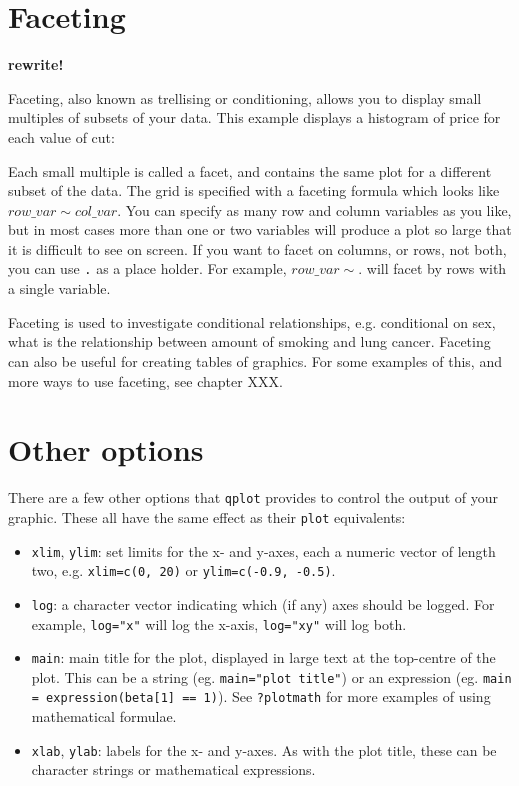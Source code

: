 \section{Faceting}\label{sec:faceting}

{\bf rewrite!}

Faceting, also known as trellising or conditioning, allows you to display small multiples of subsets of your data.  This example displays a histogram of price for each value of cut:

% 

Each small multiple is called a facet, and contains the same plot for a different subset of the data.  The grid is specified with a faceting formula which looks like $row\_var \sim col\_var $.  You can specify as many row and column variables as you like, but in most cases more than one or two variables will produce a plot so large that it is difficult to see on screen.  If you want to facet on columns, or rows, not both, you can use {\tt .} as a place holder.  For example, $row\_var \sim .$ will facet by rows with a single variable.  

% 

Faceting is used to investigate conditional relationships, e.g. conditional on sex, what is the relationship between amount of smoking and lung cancer.  Faceting can also be useful for creating tables of graphics.  For some examples of this, and more ways to use faceting, see chapter XXX.

\section{Other options}\label{sec:other_options}

There are a few other options that {\tt qplot} provides to control the output of your graphic.  These all have the same effect as their {\tt plot} equivalents:

\begin{itemize}
	\item {\tt xlim}, {\tt ylim}: set limits for the x- and y-axes, each a numeric vector of length two, e.g. {\tt xlim=c(0, 20)} or {\tt ylim=c(-0.9, -0.5)}.
	\item {\tt log}: a character vector indicating which (if any) axes should be logged.  For example, {\tt log="x"} will log the x-axis, {\tt log="xy"} will log both.
	\item {\tt main}: main title for the plot, displayed in large text at the top-centre of the plot.  This can be a string (eg. {\tt main="plot title"}) or an expression (eg. {\tt main = expression(beta[1] == 1)}).  See {\tt ?plotmath} for more examples of using mathematical formulae.
	\item {\tt xlab}, {\tt ylab}: labels for the x- and y-axes.  As with the plot title, these can be character strings or mathematical expressions.
\end{itemize}

